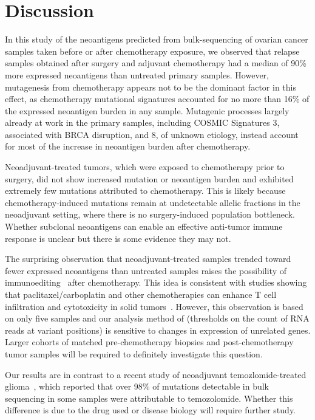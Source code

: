 \section*{Discussion}
In this study of the neoantigens predicted from bulk-sequencing of ovarian cancer samples taken before or after chemotherapy exposure, we observed that relapse samples obtained after surgery and adjuvant chemotherapy had a median of 90\% more expressed neoantigens than untreated primary samples. However, mutagenesis from chemotherapy appears not to be the dominant factor in this effect, as chemotherapy mutational signatures accounted for no more than 16\% of the expressed neoantigen burden in any sample. Mutagenic processes largely already at work in the primary samples, including COSMIC Signatures 3, associated with BRCA disruption, and 8, of unknown etiology, instead account for most of the increase in neoantigen burden after chemotherapy. 

Neoadjuvant-treated tumors, which were exposed to chemotherapy prior to surgery, did not show increased mutation or neoantigen burden and exhibited extremely few mutations attributed to chemotherapy. This is likely because chemotherapy-induced mutations remain at undetectable allelic fractions in the neoadjuvant setting, where there is no surgery-induced population bottleneck. Whether subclonal neoantigens can enable an effective anti-tumor immune response is unclear but there is some evidence they may not\cite{McGranahan_2016}.

The surprising observation that neoadjuvant-treated samples trended toward fewer expressed neoantigens than untreated samples raises the possibility of immunoediting~\cite{Dunn_2002} after chemotherapy. This idea is consistent with studies showing that paclitaxel/carboplatin and other chemotherapies can enhance T cell infiltration and cytotoxicity in solid tumors~\cite{Demaria2001,Wu_2009,Pfannenstiel_2010,Hodge_2013}. However, this observation is based on only five samples and our analysis method of (thresholds on the count of RNA reads at variant positions) is sensitive to changes in expression of unrelated genes. Larger cohorts of matched pre-chemotherapy biopsies and post-chemotherapy tumor samples will be required to definitely investigate this question.

Our results are in contrast to a recent study of neoadjuvant temozlomide-treated glioma~\cite{Johnson_2013}, which reported that over 98\% of mutations detectable in bulk sequencing in some samples were attributable to temozolomide. Whether this difference is due to the drug used or disease biology will require further study.

